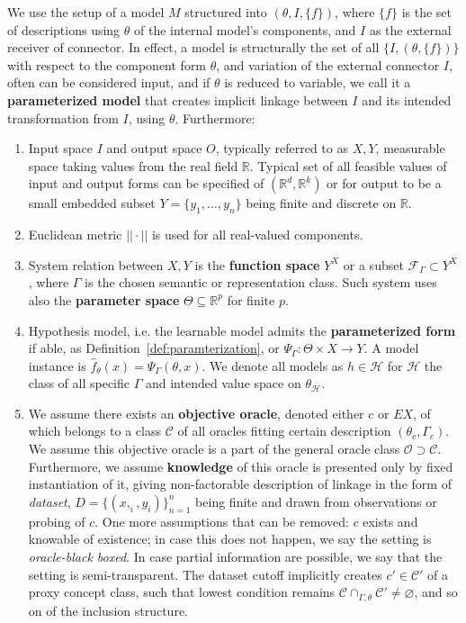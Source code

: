 \begin{construction}\label{const:bias-variance1}
We use the setup of a model $M$ structured into $(\theta, I, \{f\})$, where $\{f\}$ is the set of descriptions using $\theta$ of the internal model's components, and $I$ as the external receiver of connector. In effect, a model is structurally the set of all $\{I,(\theta, \{f\})\}$ with respect to the component form $\theta$, and variation of the external connector $I$, often can be considered input, and if $\theta$ is reduced to variable, we call it a \textbf{parameterized model} that creates implicit linkage between $I$ and its intended transformation from $I$, using $\theta$. Furthermore:
\begin{enumerate}[itemsep=0pt,topsep=1pt]
    \item Input space $I$ and output space $O$, typically referred to as $X,Y$, measurable space taking values from the real field $\mathbb{R}$. Typical set of all feasible values of input and output forms can be specified of $(\mathbb{R}^{d},\mathbb{R}^{k})$ or for output to be a small embedded subset $Y=\{y_{1},\dots,y_{n}\}$ being finite and discrete on $\mathbb{R}$.  
    \item Euclidean metric $||\cdot||$ is used for all real-valued components.
    \item System relation between $X,Y$ is the \textbf{function space} $Y^{X}$ or a subset $\mathcal{F}_{\Gamma}\subset Y^{X}$, where $\Gamma$ is the chosen semantic or representation class. Such system uses also the \textbf{parameter space} $\Theta \subseteq \mathbb{R}^{p}$ for finite $p$.
    \item Hypothesis model, i.e. the learnable model admits the \textbf{parameterized form} if able, as Definition~\ref{def:paramterization}, or $\Psi_{\Gamma}: \Theta\times X\to Y$. A model instance is $\hat{f}_{\theta}(x)=\Psi_{\Gamma}(\theta, x)$. We denote all models as $h\in \mathcal{H}$ for $\mathcal{H}$ the class of all specific $\Gamma$ and intended value space on $\theta_{\mathcal{H}}$. 
    \item We assume there exists an \textbf{objective oracle}, denoted either $c$ or $EX$, of which belongs to a class $\mathcal{C}$ of all oracles fitting certain description $(\theta_{c},\Gamma_{c})$. We assume this objective oracle is a part of the general oracle class $\mathcal{O}\supset \mathcal{C}$. Furthermore, we assume \textbf{knowledge} of this oracle is presented only by fixed instantiation of it, giving non-factorable description of linkage in the form of \textit{dataset}, $D=\{(x,_{i},y_{i})\}^{n}_{n=1}$ being finite and drawn from observations or probing of $c$. One more assumptions that can be removed: $c$ exists and knowable of existence; in case this does not happen, we say the setting is \textit{oracle-black boxed}. In case partial information are possible, we say that the setting is semi-transparent. The dataset cutoff implicitly creates $c'\in\mathcal{C}'$ of a proxy concept class, such that lowest condition remains $\mathcal{C}\cap_{\Gamma,\theta} \mathcal{C}'\neq \varnothing$, and so on of the inclusion structure. 

\end{enumerate}
\end{construction}
